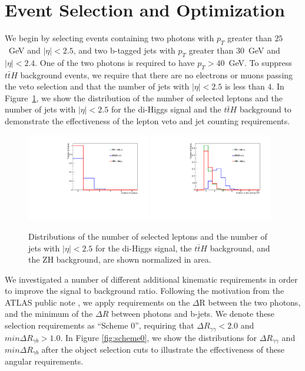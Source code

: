 \documentclass{cmspaper}
\begin{document}



\section{Event Selection and Optimization}
\label{sec:eventselection}
 
We begin by selecting events containing two photons with $p_{T}$ greater than $25$~GeV
and $|\eta|<2.5$, and two b-tagged jets with $p_{T}$ greater than $30$~GeV and $|\eta|<2.4$.
One of the two photons is required to have $p_{T} > 40$~GeV. To suppress $t\bar{t}H$ background
events, we require that there are no electrons or muons passing the veto selection and that 
the number of jets with $|\eta|<2.5$ is less than $4$. In Figure~\ref{fig:LeptonVetoAndJetCounting}, 
we show the distribution of the number of selected leptons and the number of jets with $|\eta|<2.5$ 
for the di-Higgs signal and the $t\bar{t}H$ background
to demonstrate the effectiveness of the lepton veto and jet counting requirements.

\begin{figure}[h]
\centering
\includegraphics[width=0.48\textwidth]{figures/NLeptons.pdf}	
\includegraphics[width=0.48\textwidth]{figures/Ncentraljets.pdf}	
\caption{Distributions of the number of selected leptons and the number of jets with $|\eta|<2.5$ for 
the di-Higgs signal, the $t\bar{t}H$ background, and the ZH background, are shown normalized in area.}
\label{fig:LeptonVetoAndJetCounting}
\end{figure}

We investigated a number of different additional kinematic requirements in order to improve the
signal to background ratio. Following the motivation from the ATLAS public note \cite{ATLASHHToBBGG},
we apply requirements on the $\Delta$R between the two photons, and the minimum of the 
$\Delta R$ between photons and b-jets. We denote these selection requirements as ``Scheme 0'', 
requiring that $\Delta R_{\gamma\gamma}<2.0$ and $min\Delta R_{\gamma b}>1.0$. 
In Figure \ref{fig:scheme0}, we show the distributions for $\Delta R_{\gamma\gamma}$ and $min\Delta R_{\gamma b}$ 
after the object selection cuts to illustrate the effectiveness of these angular requirements.
\end{document}
